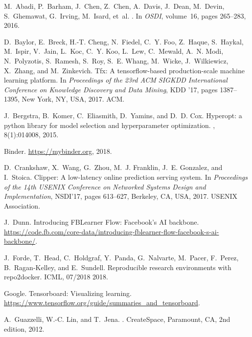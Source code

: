 \documentclass[11pt]{article}
\begin{document}
{\small

\begin{thebibliography}{10}

  M.~Abadi, P.~Barham, J.~Chen, Z.~Chen, A.~Davis, J.~Dean, M.~Devin,
    S.~Ghemawat, G.~Irving, M.~Isard, et~al.
  .
  \newblock In {\em OSDI}, volume~16, pages 265--283, 2016.

  D.~Baylor, E.~Breck, H.-T. Cheng, N.~Fiedel, C.~Y. Foo, Z.~Haque, S.~Haykal,
    M.~Ispir, V.~Jain, L.~Koc, C.~Y. Koo, L.~Lew, C.~Mewald, A.~N. Modi,
    N.~Polyzotis, S.~Ramesh, S.~Roy, S.~E. Whang, M.~Wicke, J.~Wilkiewicz,
    X.~Zhang, and M.~Zinkevich.
  \newblock Tfx: A tensorflow-based production-scale machine learning platform.
  \newblock In {\em Proceedings of the 23rd ACM SIGKDD International Conference
    on Knowledge Discovery and Data Mining}, KDD '17, pages 1387--1395, New York,
    NY, USA, 2017. ACM.

  J.~Bergstra, B.~Komer, C.~Eliasmith, D.~Yamins, and D.~D. Cox.
  \newblock Hyperopt: a python library for model selection and hyperparameter
    optimization.
  , 8(1):014008, 2015.

  {Binder}.
  \newblock \url{https://mybinder.org}, 2018.

  D.~Crankshaw, X.~Wang, G.~Zhou, M.~J. Franklin, J.~E. Gonzalez, and I.~Stoica.
  \newblock Clipper: A low-latency online prediction serving system.
  \newblock In {\em Proceedings of the 14th USENIX Conference on Networked
    Systems Design and Implementation}, NSDI'17, pages 613--627, Berkeley, CA,
    USA, 2017. USENIX Association.

  J.~Dunn.
  \newblock Introducing {FBLearner Flow}: Facebook’s {AI} backbone.
  \newblock
    \url{https://code.fb.com/core-data/introducing-fblearner-flow-facebook-s-ai-backbone/}.

  J.~Forde, T.~Head, C.~Holdgraf, Y.~Panda, G.~Nalvarte, M.~Pacer, F.~Perez,
    B.~Ragan-Kelley, and E.~Sundell.
  \newblock Reproducible research environments with repo2docker.
  \newblock ICML, 07/2018 2018.

  Google.
  \newblock Tensorboard: Visualizing learning.
  \newblock \url{https://www.tensorflow.org/guide/summaries_and_tensorboard}.

  A.~Guazzelli, W.-C. Lin, and T.~Jena.
  .
  \newblock CreateSpace, Paramount, CA, 2nd edition, 2012.


\end{thebibliography}}
\end{document}
